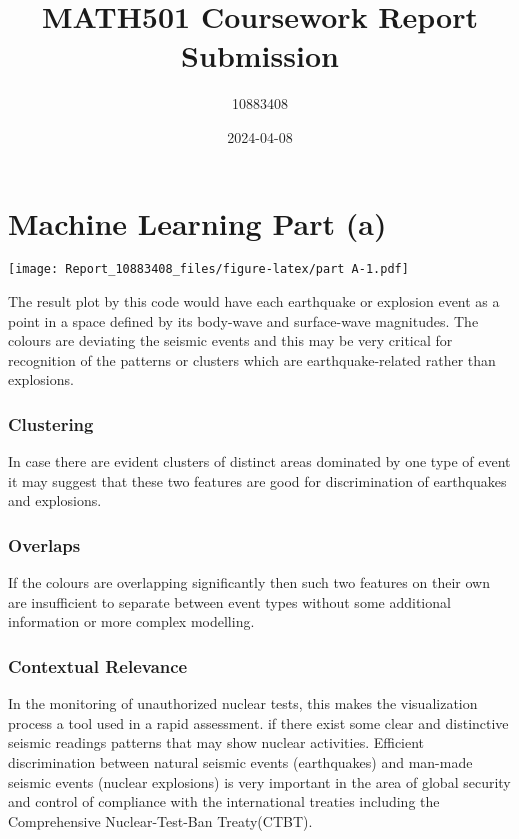 \documentclass[
]{article}
\title{MATH501 Coursework Report Submission}
\author{10883408}
\date{2024-04-08}
\begin{document}
\maketitle

\section{Machine Learning Part (a)}\label{machine-learning-part-a}

\texttt{[image: Report\_10883408\_files/figure-latex/part A-1.pdf]}

The result plot by this code would have each earthquake or explosion
event as a point in a space defined by its body-wave and surface-wave
magnitudes. The colours are deviating the seismic events and this may be
very critical for recognition of the patterns or clusters which are
earthquake-related rather than explosions.

\subsubsection{Clustering}\label{clustering}

In case there are evident clusters of distinct areas dominated by one
type of event it may suggest that these two features are good for
discrimination of earthquakes and explosions.

\subsubsection{Overlaps}\label{overlaps}

If the colours are overlapping significantly then such two features on
their own are insufficient to separate between event types without some
additional information or more complex modelling.

\subsubsection{Contextual Relevance}\label{contextual-relevance}

In the monitoring of unauthorized nuclear tests, this makes the
visualization process a tool used in a rapid assessment. if there exist
some clear and distinctive seismic readings patterns that may show
nuclear activities. Efficient discrimination between natural seismic
events (earthquakes) and man-made seismic events (nuclear explosions) is
very important in the area of global security and control of compliance
with the international treaties including the Comprehensive
Nuclear-Test-Ban Treaty(CTBT).
\end{document}
